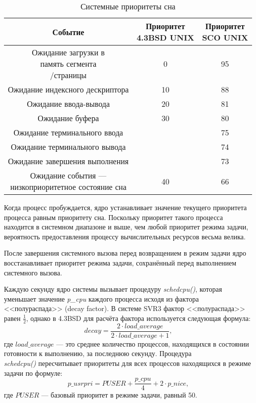 \begin{table}[h!]
	\centering
	\caption{Системные приоритеты сна}
	\begin{tabular}{|c|c|c|}
		\hline
		Событие & \makecell{Приоритет \\4.3BSD UNIX} & \makecell{Приоритет \\SCO UNIX} \\
		\hline
		\makecell{Ожидание загрузки в \\память сегмента\\/страницы} & 0 & 95 \\
		\hline
		Ожидание индексного дескриптора & 10 & 88 \\
		\hline
		Ожидание ввода-вывода & 20 & 81 \\
		\hline
		Ожидание буфера & 30 & 80 \\
		\hline
		Ожидание терминального ввода & & 75 \\
		\hline
		Ожидание терминального вывода & & 74 \\
		\hline
		Ожидание завершения выполнения & & 73 \\
		\hline
		\makecell{Ожидание события --- \\низкоприоритетное состояние сна} & 40 & 66 \\
		\hline
	\end{tabular}
	\label{tbl:sleep}
\end{table}

Когда процесс пробуждается, ядро устанавливает значение текущего приоритета процесса
равным приоритету сна. Поскольку приоритет такого процесса находится в системном 
диапазоне и выше, чем любой приоритет режима задачи, вероятность
предоставления процессу вычислительных ресурсов весьма велика.

После завершения системного вызова перед возвращением в режим задачи
ядро восстанавливает приоритет режима задачи, сохранённый
перед выполнением системного вызова.

Каждую секунду ядро системы вызывает процедуру \textit{schedcpu()}, которая
уменьшает значение \textit{p\_cpu} каждого процесса исходя из фактора <<полураспада>> 
(decay factor). В системе SVR3 фактор <<полураспада>> равен $\frac{1}{2}$, однако в 
4.3BSD для расчёта фактора используется следующая формула:
\begin{equation}
	decay = \frac{2 \cdot load\_average}{2 \cdot load\_average + 1},
\end{equation}
где $load\_average$ --- это среднее количество процессов, находящихся в состоянии 
готовности к выполнению, за последнюю секунду. Процедура \\ \textit{schedcpu()} 
пересчитывает приоритеты для всех процессов находящихся в режиме задачи по формуле:
\begin{equation}
	p\_usrpri = PUSER + \frac{p\_cpu}{4} + 2 \cdot p\_nice,
\end{equation}
где $PUSER$ --- базовый приоритет в режиме задачи, равный 50.

